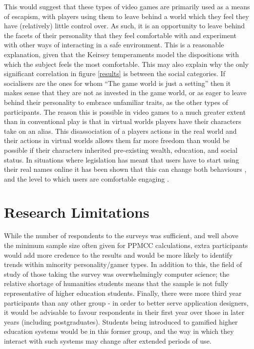 \documentclass[12pt,a4paper,twoside]{report}
\begin{document}
This would suggest that these types of video games are primarily used as a means of escapism, with players using them to leave behind a world which they feel they have (relatively) little control over. As such, it is an opportunity to leave behind the facets of their personality that they feel comfortable with and experiment with other ways of interacting in a safe environment. This is a reasonable explanation, given that the Keirsey temperaments model the dispositions with which the subject feels the most comfortable. This may also explain why the only significant correlation in figure \ref{results} is between the social categories. If socialisers are the ones for whom ``The game world is just a setting'' \cite{bartle1996hearts} then it makes sense that they are not as invested in the game world, or as eager to leave behind their personality to embrace unfamiliar traits, as the other types of participants. The reason this is possible in video games to a much greater extent than in conventional play is that in virtual worlds players have their characters take on an alias. This disassociation of a players actions in the real world and their actions in virtual worlds allows them far more freedom than would be possible if their characters inherited pre-existing wealth, education, and social status. In situations where legislation has meant that users have to start using their real names online it has been shown that this can change both behaviours \cite{cho2012empirical}, and the level to which users are comfortable engaging \cite{bellonline}.

\section{Research Limitations}
While the number of respondents to the surveys was sufficient, and well above the minimum sample size often given for PPMCC calculations, extra participants would add more credence to the results and would be more likely to identify trends within minority personality/gamer types. In addition to this, the field of study of those taking the survey was overwhelmingly computer science; the relative shortage of humanities students means that the sample is not fully representative of higher education students. Finally, there were more third year participants than any other group - in order to better serve application designers, it would be advisable to favour respondents in their first year over those in later years (including postgraduates). Students being introduced to gamified higher education systems would be in this former group, and the way in which they interact with such systems may change after extended periods of use.
\end{document}
